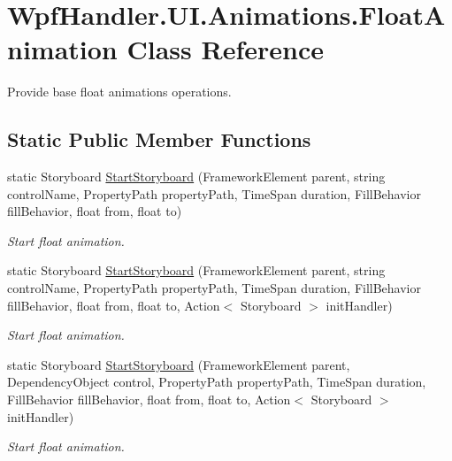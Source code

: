 \hypertarget{class_wpf_handler_1_1_u_i_1_1_animations_1_1_float_animation}{}\section{Wpf\+Handler.\+U\+I.\+Animations.\+Float\+Animation Class Reference}
\label{class_wpf_handler_1_1_u_i_1_1_animations_1_1_float_animation}


Provide base float animations operations.  


\subsection*{Static Public Member Functions}
\begin{DoxyCompactItemize}
\item 
static Storyboard \mbox{\hyperlink{class_wpf_handler_1_1_u_i_1_1_animations_1_1_float_animation_ac9202e567d294e7f920c55caa8ec6d5d}{Start\+Storyboard}} (Framework\+Element parent, string control\+Name, Property\+Path property\+Path, Time\+Span duration, Fill\+Behavior fill\+Behavior, float from, float to)
\begin{DoxyCompactList}\small\item\em Start float animation. \end{DoxyCompactList}\item 
static Storyboard \mbox{\hyperlink{class_wpf_handler_1_1_u_i_1_1_animations_1_1_float_animation_a54dbe8874dbf79f15995777dfd8993ce}{Start\+Storyboard}} (Framework\+Element parent, string control\+Name, Property\+Path property\+Path, Time\+Span duration, Fill\+Behavior fill\+Behavior, float from, float to, Action$<$ Storyboard $>$ init\+Handler)
\begin{DoxyCompactList}\small\item\em Start float animation. \end{DoxyCompactList}\item 
static Storyboard \mbox{\hyperlink{class_wpf_handler_1_1_u_i_1_1_animations_1_1_float_animation_a6d93b7112e358ffdef4ebb17fb173990}{Start\+Storyboard}} (Framework\+Element parent, Dependency\+Object control, Property\+Path property\+Path, Time\+Span duration, Fill\+Behavior fill\+Behavior, float from, float to, Action$<$ Storyboard $>$ init\+Handler)
\begin{DoxyCompactList}\small\item\em Start float animation. \end{DoxyCompactList}\end{DoxyCompactItemize}


